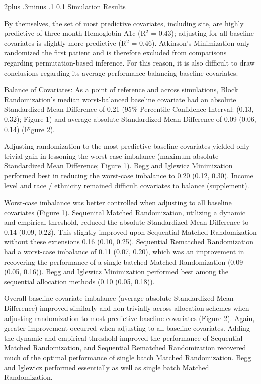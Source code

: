 \documentclass[12pt,oneside]{book}
\makeatletter
\newlength{\li}\setlength{\li}{14.48pt}
\newlength{\di}\setlength{\di}{-3.5mm}
\renewcommand\subsection{\@startsection {subsection}{2}{\z@}%
    {2\@bls  plus .3\@bls minus .1\@bls}%
    {0.1\@bls}%
    {\noindent\normalfont}}
\theoremstyle{definition}
\theoremstyle{definition}
\theoremstyle{definition}
\theoremstyle{remark}
\makeatother
\begin{document}
\hypertarget{simulation-results}{%
\subsection{Simulation Results}\label{simulation-results}}

By themselves, the set of most predictive covariates, including site,
are highly predictive of three-month Hemoglobin A1c (R\(^2\) = 0.43);
adjusting for all baseline covariates is slightly more predictive
(R\(^2\) = 0.46). Atkinson's Minimization only randomized the first
patient and is therefore excluded from comparisons regarding
permutation-based inference. For this reason, it is also difficult to
draw conclusions regarding its average performance balancing baseline
covariates.

Balance of Covariates: As a point of reference and across simulations,
Block Randomization's median worst-balanced baseline covariate had an
absolute Standardized Mean Difference of 0.21 (95\% Percentile
Confidence Interval: (0.13, 0.32); Figure 1) and average absolute
Standardized Mean Difference of 0.09 (0.06, 0.14) (Figure 2).

Adjusting randomization to the most predictive baseline covariates
yielded only trivial gain in lessoning the worst-case imbalance (maximum
absolute Standardized Mean Difference; Figure 1). Begg and Iglewicz
Minimization performed best in reducing the worst-case imbalance to 0.20
(0.12, 0.30). Income level and race / ethnicity remained difficult
covariates to balance (supplement).

Worst-case imbalance was better controlled when adjusting to all
baseline covariates (Figure 1). Sequenital Matched Randomization,
utilizing a dynamic and empirical threshold, reduced the absolute
Standardized Mean Difference to 0.14 (0.09, 0.22). This slightly
improved upon Sequential Matched Randomization without these extensions
0.16 (0.10, 0.25). Sequential Rematched Randomization had a worst-case
imbalance of 0.11 (0.07, 0.20), which was an improvement in recovering
the performance of a single batched Matched Randomization (0.09 (0.05,
0.16)). Begg and Iglewicz Minimization performed best among the
sequential allocation methods (0.10 (0.05, 0.18)).

Overall baseline covariate imbalance (average absolute Standardized Mean
Difference) improved similarly and non-trivially across allocation
schemes when adjusting randomization to most predictive baseline
covariates (Figure 2). Again, greater improvement occurred when
adjusting to all baseline covariates. Adding the dynamic and empirical
threshold improved the performance of Sequential Matched Randomization,
and Sequential Rematched Randomization recovered much of the optimal
performance of single batch Matched Randomization. Begg and Iglewicz
performed essentially as well as single batch Matched Randomization.
\end{document}
